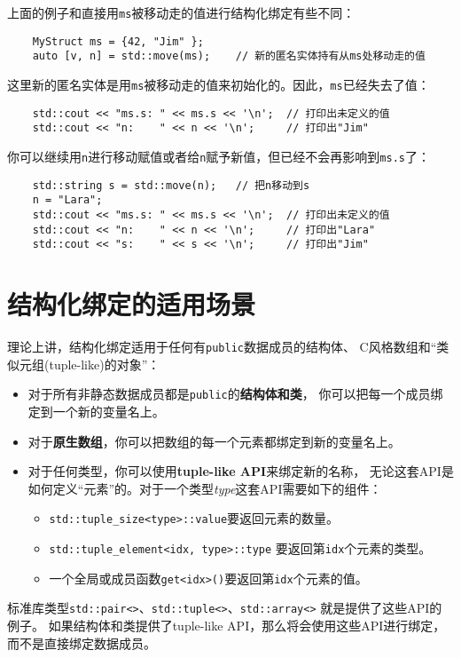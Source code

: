 上面的例子和直接用\texttt{ms}被移动走的值进行结构化绑定有些不同：
\begin{lstlisting}
    MyStruct ms = {42, "Jim" };
    auto [v, n] = std::move(ms);    // 新的匿名实体持有从ms处移动走的值
\end{lstlisting}
这里新的匿名实体是用\texttt{ms}被移动走的值来初始化的。因此，\texttt{ms}已经失去了值：
\begin{lstlisting}
    std::cout << "ms.s: " << ms.s << '\n';  // 打印出未定义的值
    std::cout << "n:    " << n << '\n';     // 打印出"Jim"
\end{lstlisting}
你可以继续用\texttt{n}进行移动赋值或者给\texttt{n}赋予新值，但已经不会再影响到\texttt{ms.s}了：
\begin{lstlisting}
    std::string s = std::move(n);   // 把n移动到s
    n = "Lara";
    std::cout << "ms.s: " << ms.s << '\n';  // 打印出未定义的值
    std::cout << "n:    " << n << '\n';     // 打印出"Lara"
    std::cout << "s:    " << s << '\n';     // 打印出"Jim"
\end{lstlisting}

\section{结构化绑定的适用场景}
理论上讲，结构化绑定适用于任何有\texttt{public}数据成员的结构体、
C风格数组和“类似元组(tuple-like)的对象”：
\begin{itemize}
    \item 对于所有非静态数据成员都是\texttt{public}的\textbf{结构体和类}，
    你可以把每一个成员绑定到一个新的变量名上。
    \item 对于\textbf{原生数组}，你可以把数组的每一个元素都绑定到新的变量名上。
    \item 对于任何类型，你可以使用\textbf{tuple-like API}来绑定新的名称，
    无论这套API是如何定义“元素”的。对于一个类型\emph{type}这套API需要如下的组件：
    \begin{itemize}
        \item \texttt{std::tuple\_size<type>::value}要返回元素的数量。
        \item \texttt{std::tuple\_element<idx, type>::type}
        要返回第\texttt{idx}个元素的类型。
        \item 一个全局或成员函数\texttt{get<idx>()}要返回第\texttt{idx}个元素的值。
    \end{itemize}
\end{itemize}
标准库类型\texttt{std::pair<>}、\texttt{std::tuple<>}、\texttt{std::array<>}
就是提供了这些API的例子。
如果结构体和类提供了tuple-like API，那么将会使用这些API进行绑定，而不是直接绑定数据成员。

